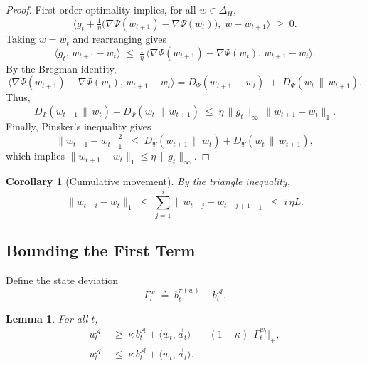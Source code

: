 \documentclass[11pt]{article}
\newtheorem{Thm:Lemma}{Lemma}
\newtheorem{Thm:Corollary}{Corollary}
\begin{document}
\begin{proof}
First-order optimality implies, for all \(w\in\Delta_H\),
\[
\Big\langle g_t + \tfrac{1}{\eta}\big(\nabla\Psi(w_{t+1})-\nabla\Psi(w_t)\big),\; w-w_{t+1} \Big\rangle \;\ge\; 0.
\]
Taking \(w=w_t\) and rearranging gives
\[
\langle g_t,\, w_{t+1}-w_t\rangle
\;\le\; \tfrac{1}{\eta}\,\big\langle \nabla\Psi(w_{t+1})-\nabla\Psi(w_t),\, w_{t+1}-w_t\big\rangle.
\]
By the Bregman identity,
\[
\big\langle \nabla\Psi(w_{t+1})-\nabla\Psi(w_t),\, w_{t+1}-w_t\big\rangle
= D_{\Psi}(w_{t+1}\,\|\,w_t)\;+\;D_{\Psi}(w_t\,\|\,w_{t+1}).
\]
Thus,
\[
D_{\Psi}(w_{t+1}\,\|\,w_t)+D_{\Psi}(w_t\,\|\,w_{t+1})
\;\le\; \eta\,\|g_t\|_\infty\,\|w_{t+1}-w_t\|_1.
\]
Finally, Pinsker’s inequality gives
\[
\|w_{t+1}-w_t\|_1^2 \;\le\; D_{\Psi}(w_{t+1}\,\|\,w_t)+D_{\Psi}(w_t\,\|\,w_{t+1}),
\]
which implies
\(\|w_{t+1}-w_t\|_1 \le \eta\,\|g_t\|_\infty\).
\end{proof}

\begin{Thm:Corollary}[Cumulative movement]
\label{cor:cum-move}
By the triangle inequality,
\[
\|w_{t-i}-w_t\|_1
\;\le\;
\sum_{j=1}^i \|w_{t-j}-w_{t-j+1}\|_1
\;\le\; i\,\eta L.
\]
\end{Thm:Corollary}



\subsection{Bounding the First Term}

Define the state deviation
\[
\Gamma_t^{w}\;\triangleq\; b_t^{\pi(w)} - b_t^\mathcal{A}.
\]

\begin{Thm:Lemma}\label{lem:bounding-u-eff}
For all \(t\),
\begin{align}
\label{eq:u-lower-bound-eff}
    u_t^\mathcal{A}
    &\;\ge\;
    \kappa\, b_t^\mathcal{A}+\langle w_t , \vec{a}_t\rangle
    \;-\;
    (1-\kappa)\,\big[\Gamma_t^{w_t}\big]_+ ,\\[4pt]
\label{eq:u-upper-bound-eff}
    u_t^\mathcal{A}
    &\;\le\;
    \kappa\, b_t^\mathcal{A}+\langle w_t , \vec{a}_t\rangle .
\end{align}
\end{Thm:Lemma}
\end{document}
